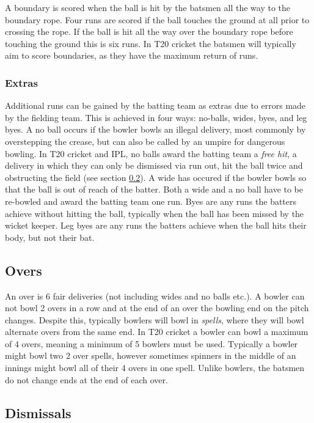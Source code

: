 \documentclass[12pt,a4paper]{report}
\theoremstyle{definition}
\begin{document}
A boundary is scored when the ball is hit by the batsmen all the way to the boundary rope.
Four runs are scored if the ball touches the ground at all prior to crossing the rope. 
If the ball is hit all the way over the boundary rope before touching the ground this is six runs. 
In T20 cricket the batsmen will typically aim to score boundaries, as they have the maximum return of runs.

\subsubsection{Extras}

Additional runs can be gained by the batting team as extras due to errors made by the fielding team. 
This is achieved in four ways: no-balls, wides, byes, and leg byes. 
A no ball occurs if the bowler bowls an illegal delivery, most commonly by overstepping the crease, but can also be called by an umpire for dangerous bowling.
In T20 cricket and IPL, no balls award the batting team a \emph{free hit}, a delivery in which they can only be dismissed via run out, hit the ball twice and obstructing the field (see section \ref{sec:Dismissals}).
A wide has occured if the bowler bowls so that the ball is out of reach of the batter.
Both a wide and a no ball have to be re-bowled and award the batting team one run.
Byes are any runs the batters achieve without hitting the ball, typically when the ball has been missed by the wicket keeper.
Leg byes are any runs the batters achieve when the ball hits their body, but not their bat.

\subsection{Overs} \label{sec:Overs}

An over is 6 fair deliveries (not including wides and no balls etc.).
A bowler can not bowl 2 overs in a row and at the end of an over the bowling end on the pitch changes. 
Despite this, typically bowlers will bowl in \emph{spells}, where they will bowl alternate overs from the same end.
In T20 cricket a bowler can bowl a maximum of 4 overs, meaning a minimum of 5 bowlers must be used. 
Typically a bowler might bowl two 2 over spells, however sometimes spinners in the middle of an innings might bowl all of their 4 overs in one spell.
Unlike bowlers, the batsmen do not change ends at the end of each over. 

\subsection{Dismissals} \label{sec:Dismissals}
\end{document}
